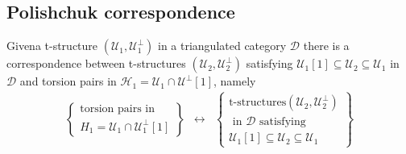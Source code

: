 \subsection{Polishchuk correspondence}

Givena t-structure $(\mathcal{U}_1,\mathcal{U}_1^\perp)$ in a triangulated category $\mathcal{D}$ there is
a correspondence between t-structures $(\mathcal{U}_2,\mathcal{U}_2^\perp)$ satisfying $\mathcal{U}_1[1]\subseteq \mathcal{U}_2\subseteq\mathcal{U}_1$
in $\mathcal{D}$ and torsion pairs in $\mathcal{H}_1=\mathcal{U}_1\cap\mathcal{U}^\perp[1]$, namely
\begin{align*}
  \left\{
  \begin{array}{c}
    \text{torsion pairs in} \\
    H_1=\mathcal{U}_1\cap \mathcal{U}_1^\perp[1]
  \end{array}
  \right\}
  &\longleftrightarrow &
  \left\{
    \begin{array}{c}
      \text{t-structures}
      (\mathcal{U}_2,\mathcal{U}_2^\perp) \\
      \text{ in } \mathcal{D}
      \text{ satisfying } \\ \mathcal{U}_1[1]\subseteq \mathcal{U}_2\subseteq\mathcal{U}_1
    \end{array}
  \right\}
\end{align*}
